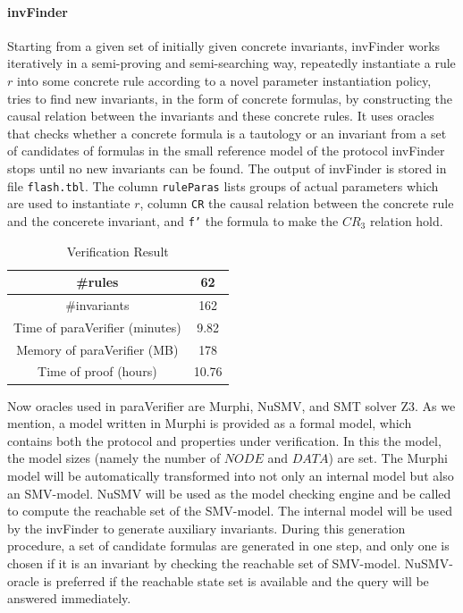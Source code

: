 \documentclass{llncs-new}
\begin{document}
\paragraph{{\sf invFinder}} Starting from a given set of initially given concrete invariants,
{\sf invFinder} works iteratively in a semi-proving and semi-searching way, repeatedly instantiate a rule $r$ into some concrete rule according to a novel parameter instantiation policy, tries to find new invariants,
in the form of concrete formulas,
by constructing the causal relation between
the invariants and these concrete rules.
It uses   oracles  that checks whether a concrete formula
is a tautology or an invariant from a set of candidates of formulas in the small reference model of the protocol
{\sf invFinder} stops until no new invariants can be found.
The output of {\sf invFinder} is stored in file {\tt flash.tbl}. The column {\tt ruleParas} lists groups of actual parameters which are used to instantiate $r$, column {\tt CR} the causal relation between the concrete rule and the concerete invariant, and {\tt f'} the formula to make the $CR_3$ relation hold.
\begin{table}
  \centering
  \footnotesize
  \vspace{-0.3cm}
   \caption{Verification Result}%
  \label{tab:flashRes}
  \begin{tabular}{|c|c|}
    \hline
    \#rules & 62\\
    \hline
    \#invariants & 162\\
    \hline
    Time of {\sf paraVerifier} (minutes) & 9.82\\
    \hline
    Memory of {\sf paraVerifier} (MB) & 178\\
    \hline
    Time of proof (hours) & 10.76\\
    \hline
  \end{tabular}
\end{table}
Now oracles used in {\sf paraVerifier} are Murphi, NuSMV, and SMT solver Z3.
 As we mention, a model written in Murphi  is provided as a formal model, which contains both the protocol and properties under verification. In this the model, the model sizes (namely the number of $NODE$ and $DATA$) are set. The Murphi model will be automatically transformed into not only an internal model but also an SMV-model. NuSMV will  be used as the model checking engine and be called to compute the reachable set of the SMV-model. The internal model will be used by the {\sf invFinder} to generate auxiliary invariants. During this generation procedure, a set of candidate  formulas are generated in one step, and only one is chosen  if it is an invariant by checking the reachable set of   SMV-model.  NuSMV-oracle is preferred if the reachable state set is available and the query will be answered immediately.
\end{document}
